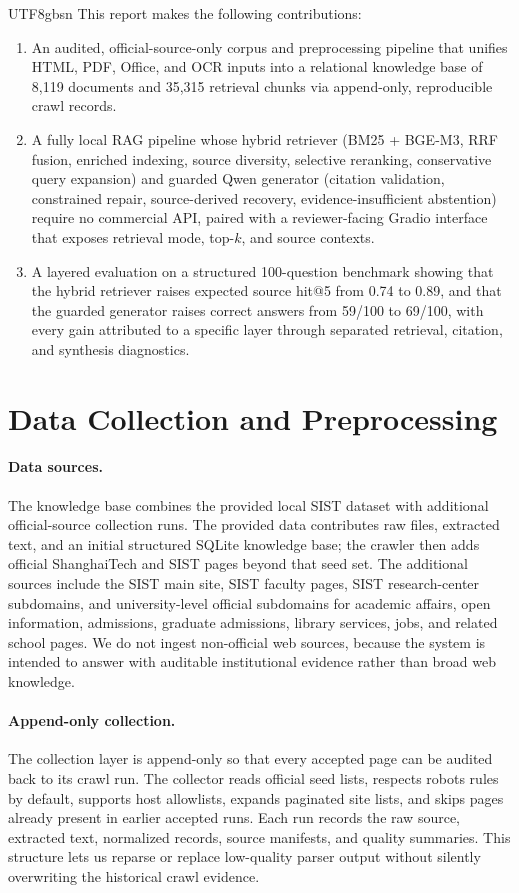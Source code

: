 \documentclass{article}
\begin{document}
\begin{CJK*}{UTF8}{gbsn}
This report makes the following contributions:
\begin{enumerate}
\item An audited, official-source-only corpus and preprocessing pipeline that unifies HTML, PDF, Office, and OCR inputs into a relational knowledge base of 8{,}119 documents and 35{,}315 retrieval chunks via append-only, reproducible crawl records.
\item A fully local RAG pipeline whose hybrid retriever (BM25 + BGE-M3, RRF fusion, enriched indexing, source diversity, selective reranking, conservative query expansion) and guarded Qwen generator (citation validation, constrained repair, source-derived recovery, evidence-insufficient abstention) require no commercial API, paired with a reviewer-facing Gradio interface that exposes retrieval mode, top-$k$, and source contexts.
\item A layered evaluation on a structured 100-question benchmark showing that the hybrid retriever raises expected source hit@5 from 0.74 to 0.89, and that the guarded generator raises correct answers from 59/100 to 69/100, with every gain attributed to a specific layer through separated retrieval, citation, and synthesis diagnostics.
\end{enumerate}

\section{Data Collection and Preprocessing}

\paragraph{Data sources.}
The knowledge base combines the provided local SIST dataset with additional official-source collection runs. The provided data contributes raw files, extracted text, and an initial structured SQLite knowledge base; the crawler then adds official ShanghaiTech and SIST pages beyond that seed set. The additional sources include the SIST main site, SIST faculty pages, SIST research-center subdomains, and university-level official subdomains for academic affairs, open information, admissions, graduate admissions, library services, jobs, and related school pages. We do not ingest non-official web sources, because the system is intended to answer with auditable institutional evidence rather than broad web knowledge.

\paragraph{Append-only collection.}
The collection layer is append-only so that every accepted page can be audited back to its crawl run. The collector reads official seed lists, respects robots rules by default, supports host allowlists, expands paginated site lists, and skips pages already present in earlier accepted runs. Each run records the raw source, extracted text, normalized records, source manifests, and quality summaries. This structure lets us reparse or replace low-quality parser output without silently overwriting the historical crawl evidence.


\end{CJK*}
\end{document}

